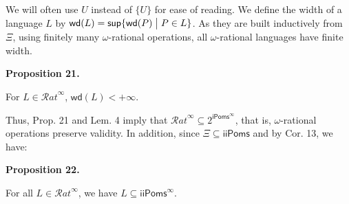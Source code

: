  
  
We will often use $U$ instead of ${\{U\}}$ for ease of reading. We define the width of a language $L$ by $\mathsf{wd}(L)=\mathsf{sup}{\{\mathsf{wd}(P)\mathrel{\big{|}}P\in L\}}$. As they are built inductively from $\Xi$, using finitely many $\omega$-rational operations, all $\omega$-rational languages have finite width.\par
 
 
 
\par\medskip\noindent\textbf{Proposition 21.}\par
 
 
For $L\in{\mathcal{R}at}^{\infty}$, $\mathsf{wd}(L)<+\infty$.\par
 
 
 
 
Thus, Prop. 21 and Lem. 4 imply that ${\mathcal{R}at}^{\infty}\subseteq 2^{\mathsf{iPoms}^{\infty}}$, that is, $\omega$-rational operations preserve validity. In addition, since $\Xi\subseteq\mathsf{iiPoms}$ and by Cor. 13, we have:\par
 
 
 
\par\medskip\noindent\textbf{Proposition 22.}\par
 
 
For all $L\in{\mathcal{R}at}^{\infty}$, we have $L\subseteq{\mathsf{iiPoms}^{\infty}}$.\par
 
 
 
 
